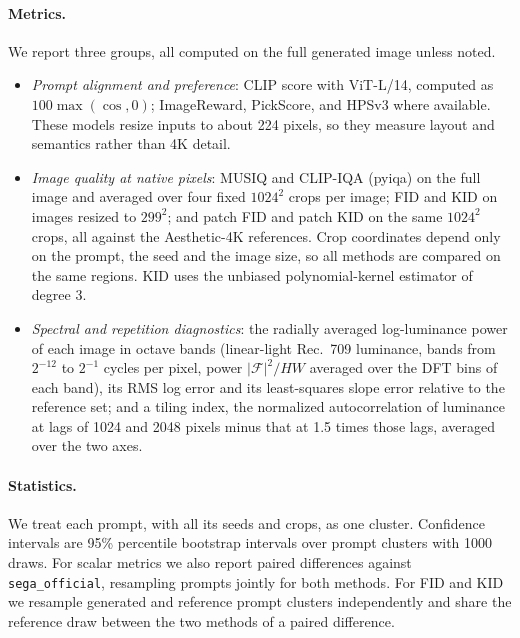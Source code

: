\paragraph{Metrics.}
We report three groups, all computed on the full generated image unless noted.
\begin{itemize}
  \item \emph{Prompt alignment and preference}: CLIP score with ViT-L/14, computed as $100\max(\cos,0)$; ImageReward, PickScore, and HPSv3 where available. These models resize inputs to about 224 pixels, so they measure layout and semantics rather than 4K detail.
  \item \emph{Image quality at native pixels}: MUSIQ and CLIP-IQA (pyiqa) on the full image and averaged over four fixed $1024^2$ crops per image; FID and KID on images resized to $299^2$; and patch FID and patch KID on the same $1024^2$ crops, all against the Aesthetic-4K references. Crop coordinates depend only on the prompt, the seed and the image size, so all methods are compared on the same regions. KID uses the unbiased polynomial-kernel estimator of degree 3.
  \item \emph{Spectral and repetition diagnostics}: the radially averaged log-luminance power of each image in octave bands (linear-light Rec.~709 luminance, bands from $2^{-12}$ to $2^{-1}$ cycles per pixel, power $|\mathcal F|^2/HW$ averaged over the DFT bins of each band), its RMS log error and its least-squares slope error relative to the reference set; and a tiling index, the normalized autocorrelation of luminance at lags of 1024 and 2048 pixels minus that at 1.5 times those lags, averaged over the two axes.
\end{itemize}

\paragraph{Statistics.}
We treat each prompt, with all its seeds and crops, as one cluster. Confidence intervals are 95\% percentile bootstrap intervals over prompt clusters with 1000 draws. For scalar metrics we also report paired differences against \texttt{sega\_official}, resampling prompts jointly for both methods. For FID and KID we resample generated and reference prompt clusters independently and share the reference draw between the two methods of a paired difference.


